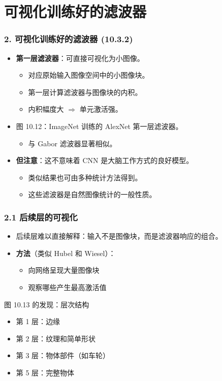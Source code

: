 \documentclass[t,aspectratio=169]{beamer} %
\begin{document}
\section{可视化训练好的滤波器}

\begin{frame}
    \frametitle{2. 可视化训练好的滤波器 (10.3.2)}
    \begin{itemize}
        \item \textbf{第一层滤波器}：可直接可视化为小图像。
        \begin{itemize}
            \item 对应原始输入图像空间中的小图像块。
            \item 第一层计算滤波器与图像块的\alert{内积}。
            \item 内积幅度大 $\Rightarrow$ 单元激活强。
        \end{itemize}
        \item 图 10.12：ImageNet 训练的 AlexNet 第一层滤波器。
        \begin{itemize}
            \item 与 Gabor 滤波器\alert{显著相似}。
        \end{itemize}
        \item \textbf{但注意}：这不意味着 CNN 是大脑工作方式的良好模型。
        \begin{itemize}
            \item 类似结果也可由多种统计方法得到。
            \item 这些滤波器是\alert{自然图像统计的一般性质}。
        \end{itemize}
    \end{itemize}
\end{frame}

\begin{frame}
    \frametitle{2.1 后续层的可视化}
    \begin{itemize}
        \item 后续层\alert{难以直接解释}：输入不是图像块，而是滤波器响应的组合。
        \item \textbf{方法}（类似 Hubel 和 Wiesel）：
        \begin{itemize}
            \item 向网络呈现大量图像块
            \item 观察哪些产生最高激活值
        \end{itemize}
    \end{itemize}
    \begin{block}{图 10.13 的发现：层次结构}
        \begin{itemize}
            \item 第 1 层：\alert{边缘}
            \item 第 2 层：\alert{纹理和简单形状}
            \item 第 3 层：\alert{物体部件}（如车轮）
            \item 第 5 层：\alert{完整物体}
        \end{itemize}
    \end{block}
\end{frame}
\end{document}
